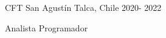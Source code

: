 \documentclass[]{awesome-cv}
\begin{document}
\vspace{4mm}
\begin{cventries}
	\vspace{-3mm}
	\cventry
	{}
	{CFT San Agustín \vspace{-5mm}}
	{Talca, Chile \vspace{-5mm}}
	{2020- 2022 \vspace{-5mm}}
	{\begin{cvsectionnormaltext} 
		\item{Analista Programador}
	\end{cvsectionnormaltext}}
\end{cventries}
\end{document}
